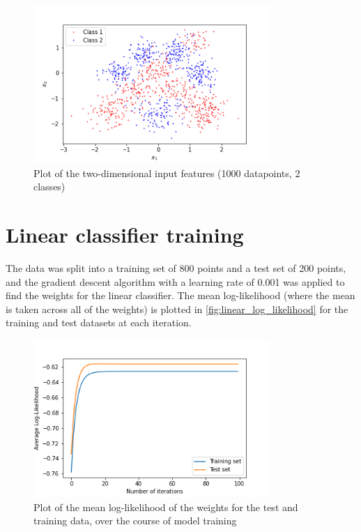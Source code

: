 \documentclass[a4paper]{article}
\begin{document}
    \begin{figure}[h]
        \label{fig:data}
        \centering
        \includegraphics[width=0.8\textwidth]{plots/data.png}
        \caption{Plot of the two-dimensional input features (1000 datapoints, 2 classes)}
    \end{figure}

    \section{Linear classifier training}\label{sec:linear-training}
    The data was split into a training set of 800 points and a test set of 200 points, and the gradient descent
    algorithm with a learning rate of 0.001 was applied to find the weights for the linear classifier. The mean
    log-likelihood (where the mean is taken across all of the weights) is plotted in \autoref{fig:linear_log_likelihood} for
    the training and test datasets at each iteration.

    \begin{figure}[h]
        \label{fig:linear_log_likelihood}
        \centering
        \includegraphics[width=0.8\textwidth]{plots/log_likelihood.png}
        \caption{Plot of the mean log-likelihood of the weights for the test and training data, over the
        course of model training}
    \end{figure}
\end{document}
